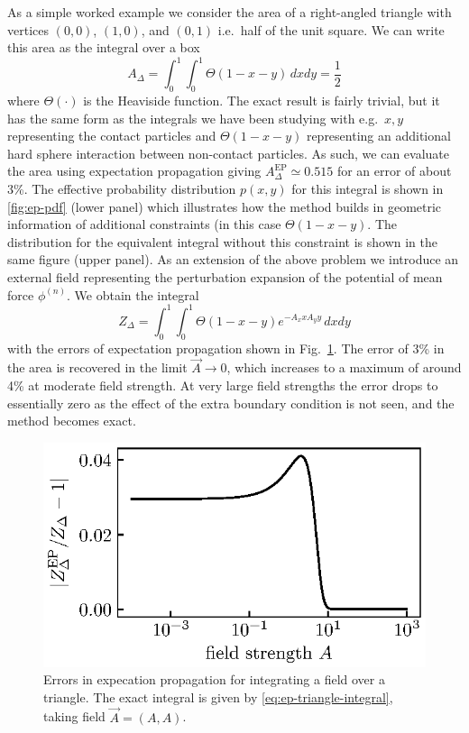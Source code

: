 \documentclass[11pt,twoside]{report}
\def\includebibliography{}
\begin{document}
As a simple worked example we consider the area of a right-angled triangle with vertices $(0,0)$, $(1,0)$, and $(0,1)$ i.e.\ half of the unit square.
We can write this area as the integral over a box
\begin{equation}\label{eq:ep-area-integral}
  A_\Delta = \int_0^1 \int_0^1 \Theta(1 - x - y) \, dx dy
  = \frac{1}{2}
\end{equation}
where $\Theta(\cdot)$ is the Heaviside function.
The exact result is fairly trivial, but it has the same form as the integrals we have been studying with e.g.\ $x,y$ representing the contact particles and $\Theta(1 - x - y)$ representing an additional hard sphere interaction between non-contact particles.
As such, we can evaluate the area using expectation propagation giving $A_\Delta^\mathrm{EP} \simeq 0.515$ for an error of about 3\%.
The effective probability distribution $p(x,y)$ for this integral is shown in \ref{fig:ep-pdf} (lower panel) which illustrates how the method builds in geometric information of additional constraints (in this case $\Theta(1 - x - y)$.
The distribution for the equivalent integral without this constraint is shown in the same figure (upper panel).
As an extension of the above problem we introduce an external field representing the perturbation expansion of the potential of mean force $\phi^{(n)}$.
We obtain the integral
\begin{equation}\label{eq:ep-triangle-integral}
  Z_\Delta = \int_0^1 \int_0^1 \Theta(1 - x - y) e^{-A_x x  A_y y} \, dx dy
\end{equation}
with the errors of expectation propagation shown in Fig.\ \ref{fig:ep-errors}.
The error of 3\% in the area is recovered in the limit $\vec{A} \to 0$, which increases to a maximum of around 4\% at moderate field strength.
At very large field strengths the error drops to essentially zero as the effect of the extra boundary condition is not seen, and the method becomes exact.

\begin{figure}
  \includegraphics[width=0.9\linewidth,outer]{ep-errors}
  \caption[Errors in expectation propagation for integrating a field over a triangle]{
    Errors in expecation propagation for integrating a field over a triangle.
    The exact integral is given by \eqref{eq:ep-triangle-integral}, taking field $\vec{A} = (A, A)$.
  }
  \label{fig:ep-errors}
\end{figure}

\ifdefined\includebibliography
  \printbibliography
\fi
\end{document}
